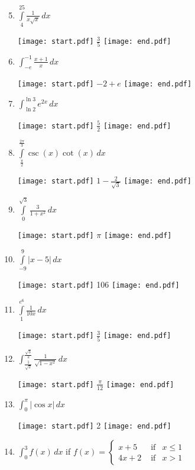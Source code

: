\documentclass[12pt]{article}
\begin{document}
\begin{enumerate}
\setcounter{enumi}{4}

\item $\int\limits_{4}^{25} \frac{1}{x\sqrt{x}}\,dx$ 

\texttt{[image: start.pdf]}
{{$\frac{3}{5}$}}
\texttt{[image: end.pdf]}


\item $\int_{-e}^{-1}{\frac{x+1}{x}} \,dx$

\texttt{[image: start.pdf]}
{{$-2+e$}}
\texttt{[image: end.pdf]}


\item $\int_{\ln{2}}^{\ln{3}}e^{2x} \,dx$

\texttt{[image: start.pdf]}
{{$\frac{5}{2}$}}
\texttt{[image: end.pdf]}


\item $\int\limits_{\frac{\pi}{2}}^{\frac{2\pi}{3}}\csc{(x)}\cot{(x)}\,dx$ 

\texttt{[image: start.pdf]}
{{$1-\frac{2}{\sqrt{3}}$}}
\texttt{[image: end.pdf]}


\item $\int\limits_{0}^{\sqrt{3}}\frac{3}{1+x^2}\,dx$ 

\texttt{[image: start.pdf]}
{{$\pi$}}
\texttt{[image: end.pdf]}


\item $\int\limits_{-9}^{9}|x-5|\,dx$ 

\texttt{[image: start.pdf]}
{{106}}
\texttt{[image: end.pdf]}


\item $\int\limits^{e^{6}}_{1}\frac{1}{10 x}\,dx$ 

\texttt{[image: start.pdf]}
{{$\frac{3}{5}$}}
\texttt{[image: end.pdf]}


\item $\int_{\frac{1}{\sqrt{2}}}^{\frac{\sqrt{3}}{2}} \frac{1}{\sqrt{1-x^2}} \,dx$ 

\texttt{[image: start.pdf]}
{{$\frac{\pi}{12}$}}
\texttt{[image: end.pdf]}


\item $\int_{0}^{\pi} |\cos{x}| \,dx$

\texttt{[image: start.pdf]}
{{2}}
\texttt{[image: end.pdf]}


\item $\int_0^3 f(x) \,dx$ if $f(x)=\left\{\begin{array}{lll}
x+5 & \text{  if} & x \leq 1\\
4x+2 & \text{  if} & x > 1
\end{array}\right.$


\end{enumerate}
\end{document}
